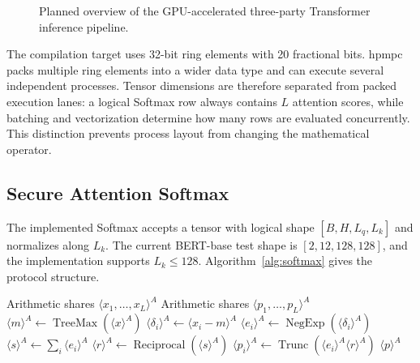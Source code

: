 \begin{figure}[t]
    \centering
    \caption{Planned overview of the GPU-accelerated three-party Transformer inference pipeline.}
    \label{fig:architecture_placeholder}
\end{figure}

The compilation target uses 32-bit ring elements with 20 fractional bits. hpmpc packs multiple ring elements into a wider data type and can execute several independent processes. Tensor dimensions are therefore separated from packed execution lanes: a logical Softmax row always contains $L$ attention scores, while batching and vectorization determine how many rows are evaluated concurrently. This distinction prevents process layout from changing the mathematical operator.

\subsection{Secure Attention Softmax}
\label{sec:softmax}
The implemented Softmax accepts a tensor with logical shape $[B,H,L_q,L_k]$ and normalizes along $L_k$. The current BERT-base test shape is $[2,12,128,128]$, and the implementation supports $L_k\leq128$. Algorithm~\ref{alg:softmax} gives the protocol structure.

\begin{algorithm}[t]
\caption{Secure row-wise attention Softmax}
\label{alg:softmax}
\begin{algorithmic}[1]
\REQUIRE Arithmetic shares $\langle x_1,\ldots,x_L\rangle^A$
\ENSURE Arithmetic shares $\langle p_1,\ldots,p_L\rangle^A$
\STATE $\langle m\rangle^A \leftarrow \operatorname{TreeMax}(\langle x\rangle^A)$
\STATE $\langle \delta_i\rangle^A \leftarrow \langle x_i-m\rangle^A$
\STATE $\langle e_i\rangle^A \leftarrow \operatorname{NegExp}(\langle\delta_i\rangle^A)$
\STATE $\langle s\rangle^A \leftarrow \sum_i\langle e_i\rangle^A$
\STATE $\langle r\rangle^A \leftarrow \operatorname{Reciprocal}(\langle s\rangle^A)$
\STATE $\langle p_i\rangle^A \leftarrow \operatorname{Trunc}(\langle e_i\rangle^A\langle r\rangle^A)$
\RETURN $\langle p\rangle^A$
\end{algorithmic}
\end{algorithm}

